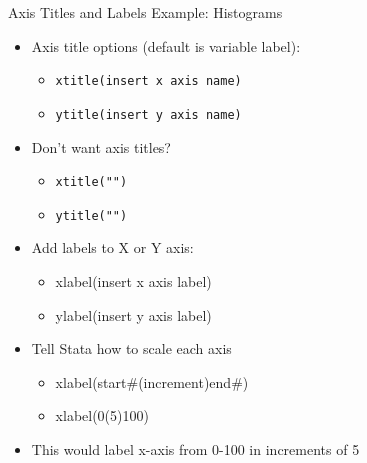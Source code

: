 \documentclass[table,smaller]{beamer}
\begin{document}
\begin{frame}[fragile,label=sec-2-5]{Axis Titles and Labels}
 Example: Histograms
\begin{itemize}
\item Axis title options (default is variable label):
\begin{itemize}
\item \texttt{xtitle(insert x axis name)}
\item \texttt{ytitle(insert y axis name)}
\end{itemize}
\item Don’t want axis titles?
\begin{itemize}
\item \texttt{xtitle("")}
\item \texttt{ytitle("")}
\end{itemize}

\item Add labels to X or Y axis:
\begin{itemize}
\item xlabel(insert x axis label)
\item ylabel(insert y axis label)
\end{itemize}
\item Tell Stata how to scale each axis
\begin{itemize}
\item xlabel(start\#(increment)end\#)
\item xlabel(0(5)100)
\end{itemize}
\item This would label x-axis from 0-100 in increments of 5
\end{itemize}
\end{frame}
\end{document}
